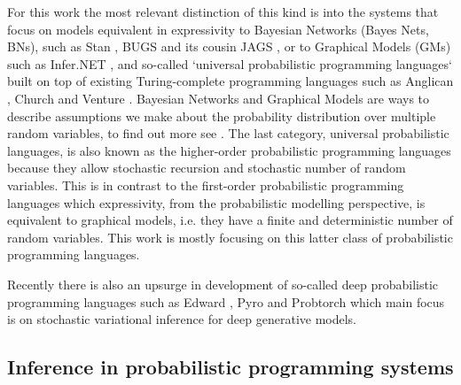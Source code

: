 \documentclass[12pt]{article}
\begin{document}

For this work the most relevant distinction of this kind is into the systems that focus on models equivalent in expressivity to Bayesian Networks (Bayes Nets, BNs), such as Stan \citep{Stan}, BUGS \citep{WinBUGS,BUGSproject} and its cousin JAGS \citep{JAGS}, or to Graphical Models (GMs) such as Infer.NET \citep{InferNET}, and so-called `universal probabilistic programming languages` built on top of existing Turing-complete programming languages such as Anglican \citep{anglican}, Church \citep{GoodmanEtAl2008} and Venture \citep{venture}.
Bayesian Networks and Graphical Models are ways to describe assumptions we make about the probability distribution over multiple random variables, to find out more see \citep{KollerFriedman2009}.
The last category, universal probabilistic languages, is also known as the higher-order probabilistic programming languages because they allow stochastic recursion and stochastic number of random variables.
This is in contrast to the first-order probabilistic programming languages which expressivity, from the probabilistic modelling perspective, is equivalent to graphical models, i.e. they have a finite and deterministic number of random variables.
This work is mostly focusing on this latter class of probabilistic programming languages.

Recently there is also an upsurge in development of so-called deep probabilistic programming languages such as Edward \citep{TranEtAl2016}, Pyro \citep{Pyro2018} and Probtorch \citep{Siddharth2017} which main focus is on stochastic variational inference for deep generative models.



\subsection{Inference in probabilistic programming systems}
\label{sec:inference-prob-prog}
\end{document}
